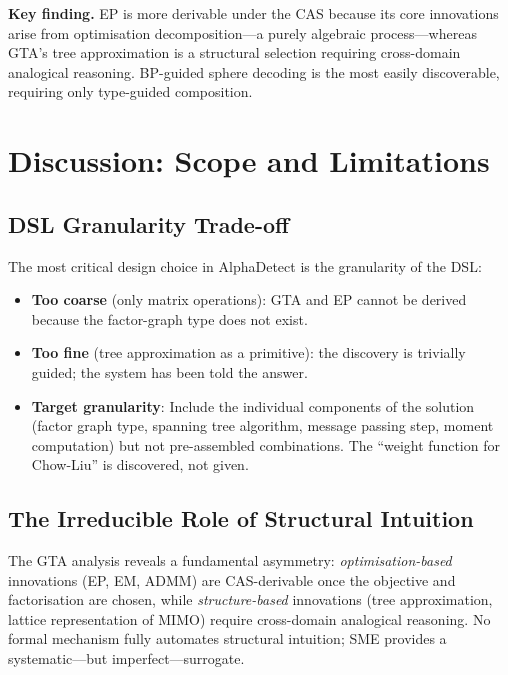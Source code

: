 \documentclass[12pt,a4paper]{article}
\begin{document}
\noindent
\textbf{Key finding.}  EP is more derivable under the CAS because its core
innovations arise from optimisation decomposition---a purely algebraic
process---whereas GTA's tree approximation is a structural selection requiring
cross-domain analogical reasoning.  BP-guided sphere decoding is the most
easily discoverable, requiring only type-guided composition.

\section{Discussion: Scope and Limitations}
\label{sec:discussion}

\subsection{DSL Granularity Trade-off}

The most critical design choice in AlphaDetect is the granularity of the DSL:

\begin{itemize}[itemsep=2pt]
  \item \textbf{Too coarse} (only matrix operations): GTA and EP cannot be
        derived because the factor-graph type does not exist.
  \item \textbf{Too fine} (tree approximation as a primitive): the discovery
        is trivially guided; the system has been told the answer.
  \item \textbf{Target granularity}: Include the individual components of the
        solution (factor graph type, spanning tree algorithm, message passing
        step, moment computation) but not pre-assembled combinations.
        The ``weight function for Chow-Liu'' is discovered, not given.
\end{itemize}

\subsection{The Irreducible Role of Structural Intuition}

The GTA analysis reveals a fundamental asymmetry:
\emph{optimisation-based} innovations (EP, EM, ADMM) are CAS-derivable once
the objective and factorisation are chosen, while \emph{structure-based}
innovations (tree approximation, lattice representation of MIMO) require
cross-domain analogical reasoning.  No formal mechanism fully automates
structural intuition; SME provides a systematic---but imperfect---surrogate.
\end{document}
